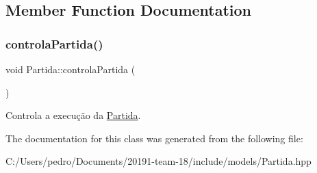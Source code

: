 \subsection{Member Function Documentation}
\mbox{\label{class_partida_ac33f17557cd766c7daccdc26dcaba906}} 
\subsubsection{\texorpdfstring{controlaPartida()}{controlaPartida()}}
{\footnotesize\ttfamily void Partida\+::controla\+Partida (\begin{DoxyParamCaption}{ }\end{DoxyParamCaption})}



Controla a execução da \mbox{\hyperlink{class_partida}{Partida}}. 



The documentation for this class was generated from the following file\+:\begin{DoxyCompactItemize}
\item 
C\+:/\+Users/pedro/\+Documents/20191-\/team-\/18/include/models/Partida.\+hpp\end{DoxyCompactItemize}
